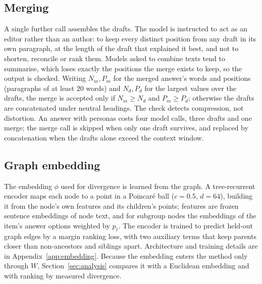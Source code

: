 \documentclass[11pt]{article}
\begin{document}
\subsection{Merging}
\label{sec:merge}

A single further call assembles the drafts. The model is instructed to act as
an editor rather than an author: to keep every distinct position from any
draft in its own paragraph, at the length of the draft that explained it best,
and not to shorten, reconcile or rank them. Models asked to combine texts tend
to summarise, which loses exactly the positions the merge exists to keep, so
the output is checked. Writing $N_m, P_m$ for the merged answer's words and
positions (paragraphs of at least $20$ words) and $N_d, P_d$ for the largest
values over the drafts, the merge is accepted only if $N_m \ge N_d$ and
$P_m \ge P_d$; otherwise the drafts are concatenated under neutral headings.
The check detects compression, not distortion. An answer with personas costs
four model calls, three drafts and one merge; the merge call is skipped when
only one draft survives, and replaced by concatenation when the drafts alone
exceed the context window.

\subsection{Graph embedding}
\label{sec:embedding}

The embedding $\phi$ used for divergence is learned from the graph. A
tree-recurrent encoder maps each node to a point in a Poincar\'e ball
($c = 0.5$, $d = 64$), building it from the node's own features and its
children's points; features are frozen sentence embeddings of node text, and
for subgroup nodes the embeddings of the item's answer options weighted by
$p_\ell$. The encoder is trained to predict held-out graph edges by a margin
ranking loss, with two auxiliary terms that keep parents closer than
non-ancestors and siblings apart. Architecture and training details are in
Appendix~\ref{app:embedding}. Because the embedding enters the method only
through $W$, Section~\ref{sec:analysis} compares it with a Euclidean
embedding and with ranking by measured divergence.

\end{document}
